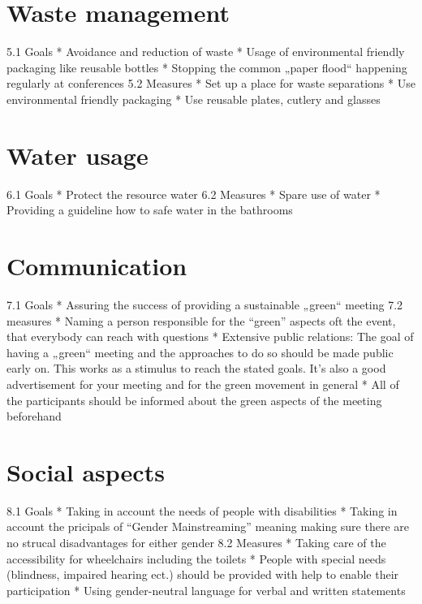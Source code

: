 \section{Waste management} 
5.1 Goals
*	Avoidance and reduction of waste
*	Usage of environmental friendly packaging like reusable bottles
*	Stopping the common „paper flood“ happening regularly at conferences 
5.2 Measures
*	Set up a place for waste separations 
*	Use environmental friendly packaging
*	Use reusable plates, cutlery and glasses

\section{Water usage}
6.1 Goals
*	Protect the resource water
6.2 Measures
*	Spare use of water
*	Providing a guideline how to safe water in the bathrooms

\section{Communication}
7.1 Goals
*	Assuring the success of providing a sustainable „green“ meeting
7.2 measures
*	Naming a person responsible for the “green” aspects oft the event, that everybody can reach with questions
*	Extensive public relations: The goal of having a „green“ meeting and the approaches to do so should be made public early on. This works as a stimulus to reach the stated goals. It's also a good advertisement for your meeting and for the green movement in general
*	All of the participants should be informed about the green aspects of the meeting beforehand 

\section{Social aspects}
8.1 Goals
*	Taking in account the needs of people with disabilities
*	Taking in account the pricipals of “Gender Mainstreaming” meaning making sure there are no strucal disadvantages for either gender  
8.2 Measures
*	Taking care of the accessibility for wheelchairs including the toilets
*	 People with special needs (blindness, impaired hearing ect.) should be provided with help to enable their participation
*	Using gender-neutral language for verbal and written statements




